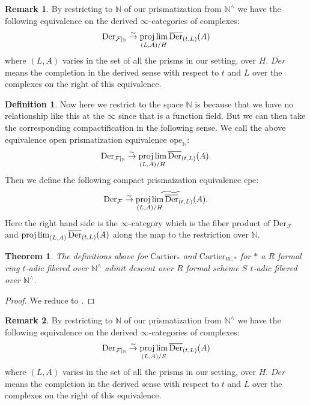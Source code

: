 \documentclass[12pt]{article}
\newtheorem{theorem}{Theorem}
\theoremstyle{definition}
\newtheorem{remark}{Remark}
\newtheorem{definition}{Definition}
\begin{document}
\begin{remark}
By restricting to $\mathbb{N}$ of our prismatization from $\mathbb{N}^\wedge$ we have the following equivalence on the derived $\infty$-categories of complexes:
\begin{align}
\mathrm{Der}_{\mathcal{F}|_{\mathbb{N}}}\overset{\sim}{\rightarrow} \projlim_{(L,A)/H}\overline{\mathrm{Der}}_{(t,L)}(A)
\end{align}
where $(L,A)$ varies in the set of all the prisms in our setting, over $H$. $\overline{Der}$ means the completion in the derived sense with respect to $t$ and $L$ over the complexes on the right of this equivalence.
\end{remark}


\begin{definition}
Now here we restrict to the space $\mathbb{N}$ is because that we have no relationship like this at the $\infty$ since that is a function field. But we can then take the corresponding compactification in the following sense. We call the above equivalence open prismatization equivalence $\mathrm{ope}_\mathbb{N}$:
\begin{align}
\mathrm{Der}_{\mathcal{F}|_{\mathbb{N}}}\overset{\sim}{\rightarrow} \projlim_{(L,A)/H}\overline{\mathrm{Der}}_{(t,L)}(A).
\end{align}
Then we define the following compact prismaization equivalence $\mathrm{cpe}$:
\begin{align}
\mathrm{Der}_{\mathcal{F}}\overset{\sim}{\rightarrow} \widetilde{\projlim_{(L,A)/H}\overline{\mathrm{Der}}_{(t,L)}(A)}.
\end{align}
Here the right hand side is the $\infty$-category which is the fiber product of $\mathrm{Der}_{\mathcal{F}}$ and $\projlim_{(L,A)}\overline{\mathrm{Der}}_{(t,L)}(A)$ along the map to the restriction over $\mathbb{N}$. \end{definition}


\begin{theorem}
The definitions above for $\mathrm{Cartier}_*$ and $\mathrm{Cartier}_{W,*}$ for $*$ a $R$ formal ring $t$-adic fibered over $\mathbb{N}^\wedge$ admit descent over $R$ formal scheme $S$ $t$-adic fibered over $\mathbb{N}^\wedge$. 
\end{theorem}

\begin{proof}
We reduce to \cite{2BL}.
\end{proof}

\begin{remark}
By restricting to $\mathbb{N}$ of our prismatization from $\mathbb{N}^\wedge$ we have the following equivalence on the derived $\infty$-categories of complexes:
\begin{align}
\mathrm{Der}_{\mathcal{F}|_{\mathbb{N}}}\overset{\sim}{\rightarrow} \projlim_{(L,A)/S}\overline{\mathrm{Der}}_{(t,L)}(A)
\end{align}
where $(L,A)$ varies in the set of all the prisms in our setting, over $H$. $\overline{Der}$ means the completion in the derived sense with respect to $t$ and $L$ over the complexes on the right of this equivalence.
\end{remark}
\end{document}
